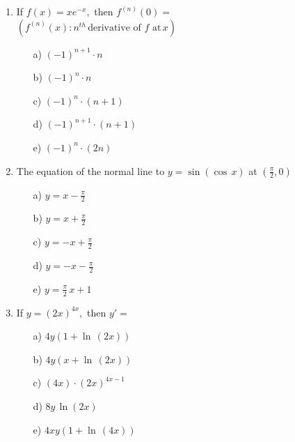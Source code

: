 \documentclass[dvips, 12pt,a4paper]{article}
\begin{document}
\begin{enumerate}
\newpage


\item If $\displaystyle f(x)=xe^{-x},$ then $f^{(n)}(0)= $\\[0.in] $(f^{(n)}(x): n^{th}\,\mbox{derivative of $f$ at}\, x)$
\\[0.2in]
\begin{itemize}
\item [a)]$(-1)^{n+1}\cdot n$
\item [b)]$(-1)^{n}\cdot n$
\item [c)]$(-1)^{n}\cdot (n+1)$
\item [d)]$(-1)^{n+1}\cdot (n+1)$
\item [e)]$(-1)^{n}\cdot (2n)$
\end{itemize}

\vspace{0.8in}

\item The equation of the normal line to $y=\sin(\cos\,x)$ at $\displaystyle \left(\frac{\pi}{2},0\right)$
\\[0.2in]
\begin{itemize}
\item [a)]$y=x-\displaystyle \frac{\pi}{2}$
\item [b)]$y=x+\displaystyle \frac{\pi}{2}$
\item [c)]$y=-x\displaystyle +\frac{\pi}{2}$
\item [d)]$y=-x\displaystyle -\frac{\pi}{2}$
\item [e)]$y=\displaystyle \frac{\pi}{2}\,x+1$
\end{itemize}

\newpage


\item If $y=(2x)^{4x},$ then $y'=$
\\[0.2in]
\begin{itemize}
\item [a)]$4y(1+\ln\,(2x))$
\item [b)]$4y(x+\ln\,(2x))$
\item [c)]$(4x)\cdot(2x)^{4x-1}$
\item [d)]$8y\,\ln(2x)$
\item [e)]$4xy(1+\ln\,(4x))$
\end{itemize}

\vspace{0.8in}


\end{enumerate}
\end{document}
